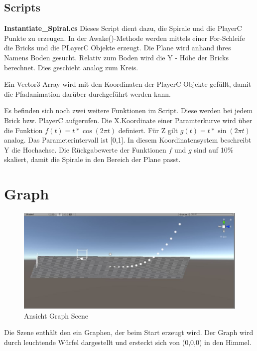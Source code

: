 \subsection{Scripts}
\textbf{Instantiate\_Spiral.cs}
Dieses Script dient dazu, die Spirale und die PlayerC Punkte zu erzeugen. In der Awake()-Methode werden mittels einer For-Schleife die Bricks und die PLayerC Objekte erzeugt. Die Plane wird anhand ihres Namens \glqq Boden{}\grqq{} gesucht. Relativ zum Boden wird die Y - Höhe der Bricks berechnet. Dies geschieht analog zum Kreis.

Ein Vector3-Array wird mit den Koordinaten der PlayerC Objekte gefüllt, damit die Pfadanimation darüber durchgeführt werden kann.

Es befinden sich noch zwei weitere Funktionen im Script. Diese werden bei jedem Brick bzw. PlayerC aufgerufen. Die X.Koordinate einer Paramterkurve wird über die Funktion $ f(t) = t * \cos(2 \pi t) $ definiert. Für Z gilt $g(t) = t * \sin(2 \pi t)$ analog. Das Parameterintervall ist [0,1]. 
 In diesem Koordinatensystem beschreibt Y die Hochachse.
Die Rückgabewerte der Funktionen $f$ und $g$ sind auf 10\% skaliert, damit die Spirale in den Bereich der Plane passt.

\section{Graph}
\label{ graphScene }

\begin{figure}[h!]
	\includegraphics[scale=0.85]{bilder/graphScene.jpg}
	\caption{Ansicht Graph Scene}
\end{figure}

Die Szene enthält den ein Graphen, der beim Start erzeugt wird. Der Graph wird durch leuchtende Würfel dargestellt und ersteckt sich von (0,0,0) in \glqq den Himmel\grqq{}.

